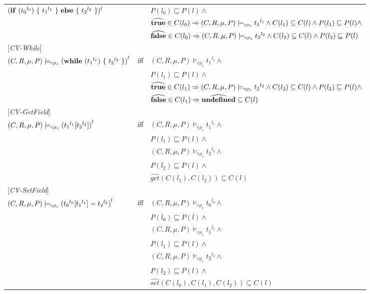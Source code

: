 \documentclass[[12pt,a4paper,twoside,openrigh]{article}
\newcommand{\envs}{(C,R,\mu, P)}
\newcommand{\ccest}[1]{\envs \models_{c \rho_s} #1}
\newcommand{\ccestl}[1]{\envs \models_{c \rho_s} {(#1)}^{l}}
\newcommand{\lbt}[1]{{t_#1}^{l_#1}}
\begin{document}
\begin{tabular}{l l l}
$(\cond {\lbt 0} {\lbt 1} {\lbt 2})^l$&& $P(l_0) \sqsubseteq P(l) \wedge$ \\
&& $\widehat{\true} \in C(l_0) \Rightarrow \ccest {\lbt 1} \wedge C(l_1) \subseteq C(l) \wedge P(l_1) \sqsubseteq P(l) \wedge$ \\
&& $\widehat{\false} \in C(l_0) \Rightarrow \ccest {\lbt 2} \wedge C(l_2) \subseteq C(l) \wedge P(l_2) \sqsubseteq P(l)$ \\
{[\textit{CV-While}]}\\
$\ccestl {\while {\lbt 1} {\lbt 2}} $& iff &$ \ccest {\lbt 1} \wedge $\\
&& $P(l_1) \sqsubseteq P(l) \wedge$ \\
&& $\widehat{\true} \in C(l_1) \Rightarrow \ccest {\lbt 2} \wedge C(l_2) \subseteq C(l) \wedge P(l_2) \sqsubseteq P(l) \wedge$\\
&& $\widehat{\mathbf{false}} \in C(l_1) \Rightarrow \widehat{\mathbf{undefined}} \subseteq C(l)$\\
{[\textit{CV-GetField}]}\\
$\ccestl {\lookup {\lbt 1} {\lbt 2}} $& iff &$ \ccest {\lbt1} \wedge $\\
&& $P(l_1) \sqsubseteq P(l) \wedge$ \\
&& $ \ccest {\lbt 2} \wedge $ \\
&& $P(l_2) \sqsubseteq P(l) \wedge$ \\
&& $\widehat{get} (C(l_1), C(l_2)) \subseteq C(l)$ \\
{[\textit{CV-SetField}]}\\
$\ccestl {\store {\lbt 0} {\lbt 1} {\lbt 2}} $& iff &$ \ccest {\lbt 0} \wedge $\\
&& $P(l_0) \sqsubseteq P(l) \wedge$ \\
&& $ \ccest {\lbt 1} \wedge $ \\
&& $P(l_1) \sqsubseteq P(l) \wedge$ \\
&& $ \ccest {\lbt 2} \wedge $ \\
&& $P(l_2) \sqsubseteq P(l) \wedge$ \\
&& $\widehat{set} (C(l_0), C(l_1), C(l_2)) \subseteq C(l)$ \\
\end{tabular}
\end{document}
